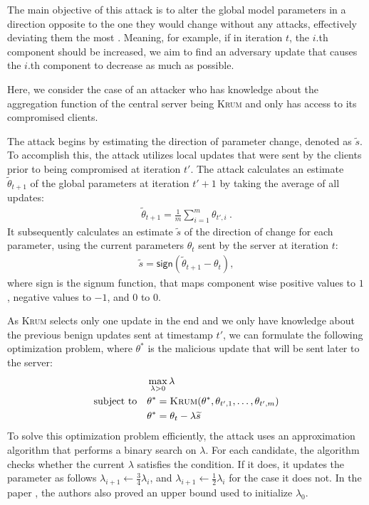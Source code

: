 \documentclass[conference]{IEEEtran}
\begin{document}
The main objective of this attack is to alter the global model parameters in a direction opposite to the one they would change without any attacks, effectively deviating them the most \cite{Fang2019}. Meaning, for example, if in iteration $t$, the $i$.th component should be increased, we aim to find an adversary update that causes the $i$.th component to decrease as much as possible.

Here, we consider the case of an attacker who has knowledge about the aggregation function of the central server being \textsc{Krum} and only has access to its compromised clients. 

The attack begins by estimating the direction of parameter change, denoted as $\tilde{s}$. To accomplish this, the attack utilizes local updates that were sent by the clients prior to being compromised at iteration $t'$. The attack calculates an estimate $\tilde{\theta}_{t+1}$ of the global parameters at iteration $t'+1$ by taking the average of all updates:
\begin{align*}
    \tilde{\theta}_{t+1} = \frac{1}{m}\sum_{i=1}^{m}\theta_{t', i} \ .
\end{align*}
It subsequently calculates an estimate $\tilde{s}$ of the direction of change for each parameter, using the current parameters $\theta_t$ sent by the server at iteration $t$:
\begin{align}
    \tilde{s} = \textsf{sign}(\tilde{\theta}_{t+1} - \theta_t), 
\end{align}
where \textsf{sign} is the signum function, that maps component wise positive values to $1$, negative values to $-1$, and $0$ to $0$.

As \textsc{Krum} selects only one update in the end and we only have knowledge about the previous benign updates sent at timestamp $t'$, we can formulate the following optimization problem, where $\theta^*$ is the malicious update that will be sent later to the server:
\begin{align}
    &\max_{\lambda > 0} \lambda\\
    \text{subject to} \quad &\theta^* =  \textsc{Krum}(\theta^*, \theta_{t', 1}, \dots ,\theta_{t', m}) \nonumber\\
    &\theta^* = \theta_t - \lambda \widetilde{s} \nonumber
\end{align}
To solve this optimization problem efficiently, the attack uses an approximation algorithm that performs a binary search on $\lambda$. For each candidate, the algorithm checks whether the current $\lambda$ satisfies the condition. If it does, it updates the parameter as follows $\lambda_{i+1} \leftarrow \frac{3}{4} \lambda_i$, and $\lambda_{i+1} \leftarrow \frac{1}{2} \lambda_i$ for the case it does not. In the paper \cite{Fang2019}, the authors also proved an upper bound used to initialize $\lambda_0$.
\end{document}
